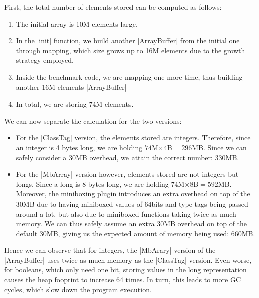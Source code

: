 First, the total number of elements stored can be computed as follows:
\begin{enumerate}
  \item The initial array is 10M elements large.
  \item In the |init| function, we build another |ArrayBuffer| from the initial one through mapping, which size grows up to 16M elements due to the growth strategy employed.
  \item Inside the benchmark code, we are mapping one more time, thus building another 16M elements |ArrayBuffer|
  \item In total, we are storing 74M elements.
\end{enumerate}

We can now separate the calculation for the two versions:
\begin{itemize}
	\item For the |ClassTag| version, the elements stored are integers. Therefore, since an integer is 4 bytes long, we are holding $74$M$ \times 4$B$ = 296$MB. Since we can safely consider a 30MB overhead, we attain the correct number: 330MB.
	\item For the |MbArray| version however, elements stored are not integers but longs. Since a long is 8 bytes long, we are holding $74$M$ \times 8$B$ = 592$MB. Moreover, the miniboxing plugin introduces an extra overhead on top of the 30MB due to having miniboxed values of 64bits and type tags being passed around a lot, but also due to miniboxed functions taking twice as much memory. We can thus safely assume an extra 30MB overhead on top of the default 30MB, giving us the expected amount of memory being used: 660MB. 
\end{itemize}

Hence we can observe that for integers, the |MbArary| version of the |ArrayBuffer| uses twice as much memory as the |ClassTag| version. Even worse, for booleans, which only need one bit, storing values in the long representation causes the heap fooprint to increase 64 times. In turn, this leads to more GC cycles, which slow down the program execution.


